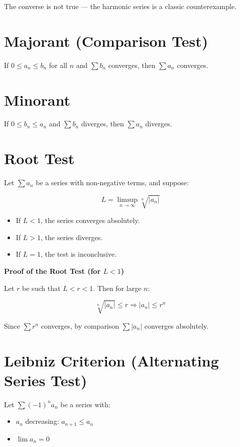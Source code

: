 The converse is not true — the harmonic series is a classic counterexample.

\section{Majorant (Comparison Test)}

If \(0 \le a_n \le b_n\) for all \(n\) and \(\sum b_n\) converges, then \(\sum a_n\) converges.

\section{Minorant}

If \(0 \le b_n \le a_n\) and \(\sum b_n\) diverges, then \(\sum a_n\) diverges.

\section{Root Test}

Let \(\sum a_n\) be a series with non-negative terms, and suppose:

\[
    L = \limsup_{n \to \infty} \sqrt[n]{|a_n|}
\]

\begin{itemize}

  \item If \(L < 1\), the series converges absolutely.

  \item If \(L > 1\), the series diverges.

  \item If \(L = 1\), the test is inconclusive.

\end{itemize}

\textbf{Proof of the Root Test (for \(L < 1\))}

Let \(r\) be such that \(L < r < 1\). Then for large \(n\):

\[
    \sqrt[n]{|a_n|} \le r \Rightarrow |a_n| \le r^n
\]

Since \(\sum r^n\) converges, by comparison \(\sum |a_n|\) converges absolutely.

\section{Leibniz Criterion (Alternating Series Test)}

Let \(\sum {(-1)}^n a_n\) be a series with:

\begin{itemize}

  \item \(a_n\) decreasing: \(a_{n+1} \le a_n\)

  \item \(\lim a_n = 0\)

\end{itemize}

